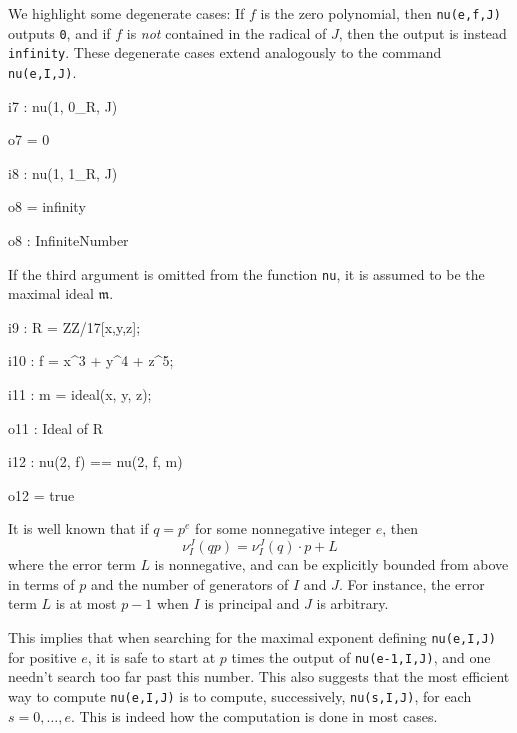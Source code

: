 \documentclass{amsart}
\newcommand{\idealm}{\mathfrak{m}}
\begin{document}

We highlight some degenerate cases:  If $f$ is the zero polynomial, then {\tt nu(e,f,J)} outputs {\tt 0}, and if $f$ is \emph{not} contained in the radical of $J$, then the output is instead {\tt infinity}.  These degenerate cases extend analogously to the command {\tt nu(e,I,J)}.

{\small
{}
\begin{MyVerbatim}

i7 : nu(1, 0_R, J)

o7 = 0

i8 : nu(1, 1_R, J)

o8 = infinity

o8 : InfiniteNumber
\end{MyVerbatim}
}
\medspace


If the third argument is omitted from the function {\tt nu}, it is assumed to be the maximal ideal $\idealm$.

{\small
{}
\begin{MyVerbatim}

i9 : R = ZZ/17[x,y,z];

i10 : f = x^3 + y^4 + z^5;

i11 : m = ideal(x, y, z);

o11 : Ideal of R

i12 : nu(2, f) == nu(2, f, m)

o12 = true
\end{MyVerbatim}
}
\medspace


It is well known that if $q=p^e$ for some nonnegative integer $e$, then \[ \nu_I^J(qp) = \nu_I^J(q)\cdot p + L\]  where the error term $L$ is nonnegative, and can be explicitly bounded from above in terms of $p$ and the number of generators of $I$ and $J$.  For instance, the error term $L$ is at most $p-1$ when $I$ is principal and $J$ is arbitrary.

This implies that when searching for the maximal exponent defining {\tt nu(e,I,J)} for positive $e$, it is safe to start at $p$ times the output of {\tt nu(e-1,I,J)}, and one needn't search too far past this number.  This also suggests that the most efficient way to compute {\tt nu(e,I,J)} is to compute, successively, {\tt nu(s,I,J)}, for each $s = 0,\ldots,e$.  This is indeed how the computation is done in most cases.
\end{document}
